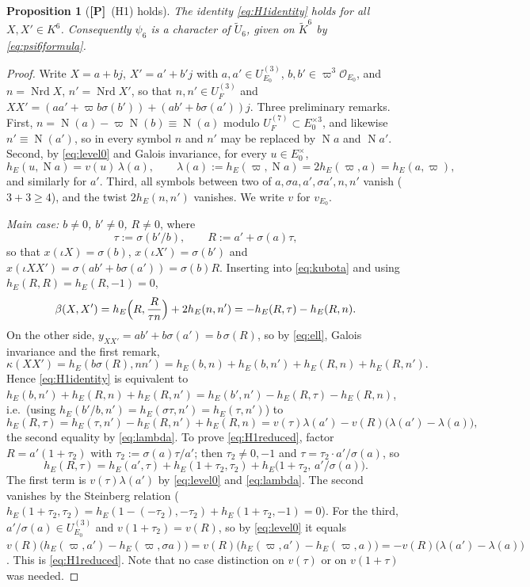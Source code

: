 \documentclass[11pt]{article}
\newcommand{\Nm}{\operatorname N}
\newcommand{\Nrd}{\operatorname{Nrd}}
\newcommand{\tU}{\widetilde U}
\newcommand{\Ocal}{\mathcal O}
\newcommand{\Ptag}{\textnormal{\textbf{[P]}}}
\theoremstyle{plain}
\newtheorem{proposition}[theorem]{Proposition}
\theoremstyle{definition}
\begin{document}
\begin{proposition}[\Ptag\ (H1) holds]\label{prop:H1}
The identity \eqref{eq:H1identity} holds for all $X,X'\in K^6$.
Consequently $\psi_6$ is a character of $\tU_6$, given on
$\tilde K^6$ by \eqref{eq:psi6formula}.
\end{proposition}
\begin{proof}
Write $X=a+bj$, $X'=a'+b'j$ with $a,a'\in U^{(3)}_{E_0}$, $b,b'\in\varpi^3\Ocal_{E_0}$,
and $n=\Nrd X$, $n'=\Nrd X'$, so that $n,n'\in U_F^{(3)}$ and
$XX'=(aa'+\varpi b\sigma(b'))+(ab'+b\sigma(a'))j$.  Three preliminary
remarks.  First, $n=\Nm(a)-\varpi\Nm(b)\equiv\Nm(a)$ modulo
$U^{(7)}_F\subset E_0^{\times3}$, and likewise $n'\equiv\Nm(a')$, so in
every symbol $n$ and $n'$ may be replaced by $\Nm a$ and $\Nm a'$.
Second, by \eqref{eq:level0} and Galois invariance, for every
$u\in E_0^\times$,
\begin{equation}\label{eq:lambda}
 h_E(u,\Nm a)=v(u)\,\lambda(a),\qquad \lambda(a):=h_E(\varpi,\Nm a)=2h_E(\varpi,a)=h_E(a,\varpi),
\end{equation}
and similarly for $a'$.  Third, all symbols between two of
$a,\sigma a,a',\sigma a',n,n'$ vanish ($3+3\ge4$), and the twist
$2h_E(n,n')$ vanishes.  We write $v$ for $v_{E_0}$.

\emph{Main case: $b\ne0$, $b'\ne0$, $R\ne0$}, where
\[
 \tau:=\sigma(b'/b),\qquad R:=a'+\sigma(a)\tau,
\]
so that $x(\iota X)=\sigma(b)$, $x(\iota X')=\sigma(b')$ and
$x(\iota XX')=\sigma(ab'+b\sigma(a'))=\sigma(b)R$.  Inserting into
\eqref{eq:kubota} and using $h_E(R,R)=h_E(R,-1)=0$,
\begin{equation}\label{eq:betaK6}
 \beta(X,X')=h_E\Bigl(R,\frac{R}{\tau n}\Bigr)+2h_E(n,n')=-h_E(R,\tau)-h_E(R,n).
\end{equation}
On the other side, $y_{XX'}=ab'+b\sigma(a')=b\,\sigma(R)$, so by
\eqref{eq:ell}, Galois invariance and the first remark,
\[
 \kappa(XX')=h_E(b\sigma(R),nn')=h_E(b,n)+h_E(b,n')+h_E(R,n)+h_E(R,n').
\]
Hence \eqref{eq:H1identity} is equivalent to
$h_E(b,n')+h_E(R,n)+h_E(R,n')=h_E(b',n')-h_E(R,\tau)-h_E(R,n)$, i.e.\ (using $h_E(b'/b,n')=h_E(\sigma\tau,n')=h_E(\tau,n')$) to
\begin{equation}\label{eq:H1reduced}
 h_E(R,\tau)=h_E(\tau,n')-h_E(R,n')+h_E(R,n)=v(\tau)\lambda(a')-v(R)\bigl(\lambda(a')-\lambda(a)\bigr),
\end{equation}
the second equality by \eqref{eq:lambda}.  To prove
\eqref{eq:H1reduced}, factor $R=a'(1+\tau_2)$ with
$\tau_2:=\sigma(a)\tau/a'$; then $\tau_2\ne0,-1$ and
$\tau=\tau_2\cdot a'/\sigma(a)$, so
\[
 h_E(R,\tau)=h_E(a',\tau)+h_E(1+\tau_2,\tau_2)+h_E\bigl(1+\tau_2,\,a'/\sigma(a)\bigr).
\]
The first term is $v(\tau)\lambda(a')$ by \eqref{eq:level0} and
\eqref{eq:lambda}.  The second vanishes by the Steinberg relation
($h_E(1+\tau_2,\tau_2)=h_E(1-(-\tau_2),-\tau_2)+h_E(1+\tau_2,-1)=0$).
For the third, $a'/\sigma(a)\in U^{(3)}_{E_0}$ and $v(1+\tau_2)=v(R)$, so
by \eqref{eq:level0} it equals
$v(R)\bigl(h_E(\varpi,a')-h_E(\varpi,\sigma a)\bigr)=v(R)\bigl(h_E(\varpi,a')-h_E(\varpi,a)\bigr)=-v(R)\bigl(\lambda(a')-\lambda(a)\bigr)$.
This is \eqref{eq:H1reduced}.  Note that no case distinction on
$v(\tau)$ or on $v(1+\tau)$ was needed.


\end{proof}
\end{document}
